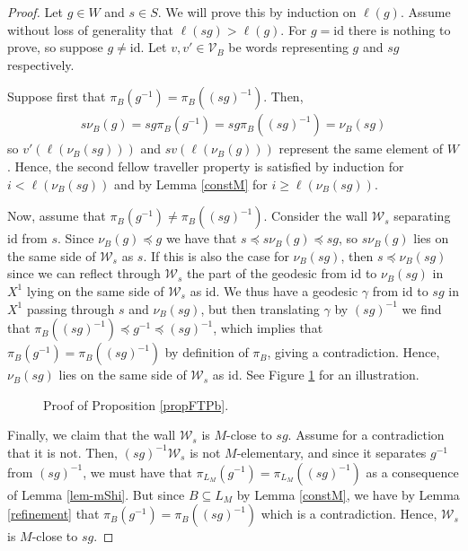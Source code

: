\documentclass[10pt,a4paper]{amsart}
\newcommand{\V}{\mathcal{V}}
\newcommand{\W}{\mathcal{W}}
\newcommand{\id}{\text{id}}
\newcommand{\vr}{\nu}
\begin{document}
\begin{proof}
    Let $g \in W$ and $s \in S$. We will prove this by induction on $\ell(g)$. Assume without loss of generality that $\ell(sg)>\ell(g)$. For $g = \id$ there is nothing to prove, so suppose $g \neq \id$. Let $v,v' \in \V_B$ be words representing $g$ and $sg$ respectively. 
    
    Suppose first that $\pi_B(g^{-1}) = \pi_B((sg)^{-1})$. Then,
    \begin{align*}
        s\vr_B(g) = sg\pi_B(g^{-1}) = sg\pi_B((sg)^{-1}) = \vr_B(sg)
    \end{align*}
    so $v'(\ell(\vr_B(sg)))$ and $sv(\ell(\vr_B(g)))$ represent the same element of $W$. Hence, the second fellow traveller property is satisfied by induction for $i < \ell(\vr_B(sg))$ and by Lemma \ref{constM} for $i \geq \ell(\vr_B(sg))$.

    Now, assume that $\pi_B(g^{-1}) \neq \pi_B((sg)^{-1})$. Consider the wall $\W_s$ separating $\id$ from $s$. Since $\vr_B(g) \preceq g$ we have that $s \preceq s\vr_B(g) \preceq sg$, so $s\vr_B(g)$ lies on the same side of $\W_s$ as $s$. If this is also the case for $\vr_B(sg)$, then $s \preceq \vr_B(sg)$ since we can reflect through $\W_s$ the part of the geodesic from $\id$ to $\vr_B(sg)$ in $X^1$ lying on the same side of $\W_s$ as $\id$. We thus have a geodesic $\gamma$ from $\id$ to $sg$ in $X^1$ passing through $s$ and $\vr_B(sg)$, but then translating $\gamma$ by $(sg)^{-1}$ we find that $\pi_B((sg)^{-1}) \preceq g^{-1} \preceq (sg)^{-1}$, which implies that $\pi_B(g^{-1}) = \pi_B((sg)^{-1})$ by definition of $\pi_B$, giving a contradiction. Hence, $\vr_B(sg)$ lies on the same side of $\W_s$ as $\id$. See Figure \ref{f:ftpfig} for an illustration.

    \begin{figure}[h]
    \begin{center}
    
    \end{center}
    \caption{Proof of Proposition \ref{propFTPb}.}
    \label{f:ftpfig}
    \end{figure}
    
    Finally, we claim that the wall $\W_s$ is $M$-close to $sg$. Assume for a contradiction that it is not. Then, $(sg)^{-1}\W_s$ is not $M$-elementary, and since it separates $g^{-1}$ from $(sg)^{-1}$, we must have that $\pi_{L_M}(g^{-1}) = \pi_{L_M}((sg)^{-1})$ as a consequence of Lemma \ref{lem-mShi}. But since $B \subseteq L_M$ by Lemma \ref{constM}, we have by Lemma \ref{refinement} that $\pi_B(g^{-1}) = \pi_B((sg)^{-1})$ which is a contradiction. Hence, $\W_s$ is $M$-close to $sg$. 


\end{proof}
\end{document}

